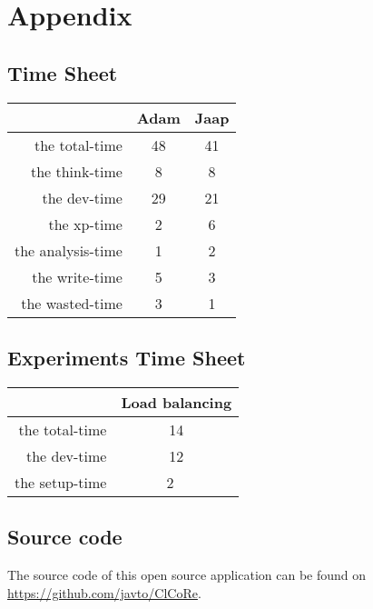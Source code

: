 \section{Appendix}

\subsection{Time Sheet}

\label{timesheet}

\begin{tabular}{| r | c | c |}
	\hline
 					& Adam 	& Jaap \\ \hline
  	the total-time 	& 48 	& 41	\\ \hline
	the think-time 	& 8 		& 8 	\\ \hline
 	the dev-time		& 29		& 21	\\ \hline
	the xp-time		& 2		& 6 	\\ \hline
	the analysis-time 	& 1		& 2	\\ \hline
	the write-time 	& 5		& 3	\\ \hline
	the wasted-time 	& 3		& 1	\\ \hline
\end{tabular}

\subsection{Experiments Time Sheet}
\begin{tabular}{| r | c |}
	\hline
 					& Load balancing \\ \hline
  	the total-time 	& 14		\\ \hline
	the dev-time 		& 12 	\\ \hline
 	the setup-time	& 2		\ \hline
\end{tabular}

\subsection{Source code}
The source code of this open source application can be found on \url{https://github.com/javto/ClCoRe}.